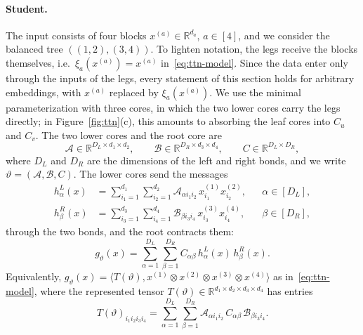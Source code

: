 \documentclass[11pt]{article}
\newcommand{\R}{\mathbb{R}}
\newcommand{\ip}[2]{\langle #1,#2\rangle}
\theoremstyle{definition}
\numberwithin{equation}{section}
\begin{document}
\paragraph{Student.}
The input consists of four blocks $x^{(a)}\in\R^{d_a}$, $a\in[4]$, and we consider the balanced tree $((1,2),(3,4))$. To lighten notation, the legs receive the blocks themselves, i.e.\ $\xi_a(x^{(a)})=x^{(a)}$ in~\eqref{eq:ttn-model}. Since the data enter only through the inputs of the legs, every statement of this section holds for arbitrary embeddings, with $x^{(a)}$ replaced by $\xi_a(x^{(a)})$. We use the minimal parameterization with three cores, in which the two lower cores carry the legs directly; in Figure~\ref{fig:ttn}(c), this amounts to absorbing the leaf cores into $C_u$ and $C_v$. The two lower cores and the root core are
\[
\mathcal A\in\R^{D_L\times d_1\times d_2},\qquad\mathcal B\in\R^{D_R\times d_3\times d_4},\qquad C\in\R^{D_L\times D_R},
\]
where $D_L$ and $D_R$ are the dimensions of the left and right bonds, and we write $\vartheta=(\mathcal A,\mathcal B,C)$. The lower cores send the messages
\begin{align}
h^L_\alpha(x)&=\sum_{i_1=1}^{d_1}\sum_{i_2=1}^{d_2}\mathcal A_{\alpha i_1i_2}\,x^{(1)}_{i_1}x^{(2)}_{i_2},&&\alpha\in[D_L],\label{eq:d2-hL}\\
h^R_\beta(x)&=\sum_{i_3=1}^{d_3}\sum_{i_4=1}^{d_4}\mathcal B_{\beta i_3i_4}\,x^{(3)}_{i_3}x^{(4)}_{i_4},&&\beta\in[D_R],\label{eq:d2-hR}
\end{align}
through the two bonds, and the root contracts them:
\begin{equation}\label{eq:d2-output-index}
g_\vartheta(x)=\sum_{\alpha=1}^{D_L}\sum_{\beta=1}^{D_R}C_{\alpha\beta}\,h^L_\alpha(x)\,h^R_\beta(x).
\end{equation}
Equivalently, $g_\vartheta(x)=\ip{T(\vartheta)}{x^{(1)}\otimes x^{(2)}\otimes x^{(3)}\otimes x^{(4)}}$ as in~\eqref{eq:ttn-model}, where the represented tensor $T(\vartheta)\in\R^{d_1\times d_2\times d_3\times d_4}$ has entries
\begin{equation}\label{eq:d2-coefficient-tensor}
T(\vartheta)_{i_1i_2i_3i_4}=\sum_{\alpha=1}^{D_L}\sum_{\beta=1}^{D_R}\mathcal A_{\alpha i_1i_2}\,C_{\alpha\beta}\,\mathcal B_{\beta i_3i_4}.
\end{equation}
\end{document}
